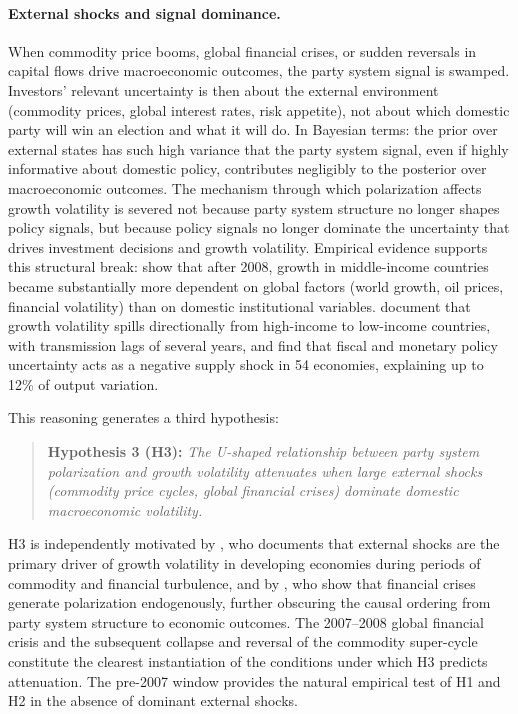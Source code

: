 \documentclass[12pt]{article}
\begin{document}
\paragraph{External shocks and signal dominance.} When commodity price
booms, global financial crises, or sudden reversals in capital flows drive
macroeconomic outcomes, the party system signal is swamped. Investors'
relevant uncertainty is then about the external environment (commodity
prices, global interest rates, risk appetite), not about which domestic
party will win an election and what it will do. In Bayesian terms: the
prior over external states has such high variance that the party system
signal, even if highly informative about domestic policy, contributes
negligibly to the posterior over macroeconomic outcomes. The mechanism
through which polarization affects growth volatility is severed not because
party system structure no longer shapes policy signals, but because policy
signals no longer dominate the uncertainty that drives investment decisions
and growth volatility. Empirical evidence supports this structural break:
\citet{Aizenman2018} show that after 2008, growth in middle-income
countries became substantially more dependent on global factors (world
growth, oil prices, financial volatility) than on domestic institutional
variables. \citet{Abosedra2019} document that growth volatility spills
directionally from high-income to low-income countries, with transmission
lags of several years, and \citet{MumtazRuch2025} find that fiscal and
monetary policy uncertainty acts as a negative supply shock in 54
economies, explaining up to 12\% of output variation.

This reasoning generates a third hypothesis:

\begin{quote}
\textbf{Hypothesis 3 (H3):} \textit{The U-shaped relationship between party
system polarization and growth volatility attenuates when large external
shocks (commodity price cycles, global financial crises) dominate
domestic macroeconomic volatility.}
\end{quote}

\noindent H3 is independently motivated by \citet{Raddatz2007}, who
documents that external shocks are the primary driver of growth volatility in
developing economies during periods of commodity and financial turbulence,
and by \citet{FunkeST2016}, who show that financial crises generate
polarization endogenously, further obscuring the causal ordering from
party system structure to economic outcomes. The 2007--2008 global financial
crisis and the subsequent collapse and reversal of the commodity super-cycle
constitute the clearest instantiation of the conditions under which H3
predicts attenuation. The pre-2007 window provides the natural empirical
test of H1 and H2 in the absence of dominant external shocks.
\end{document}
